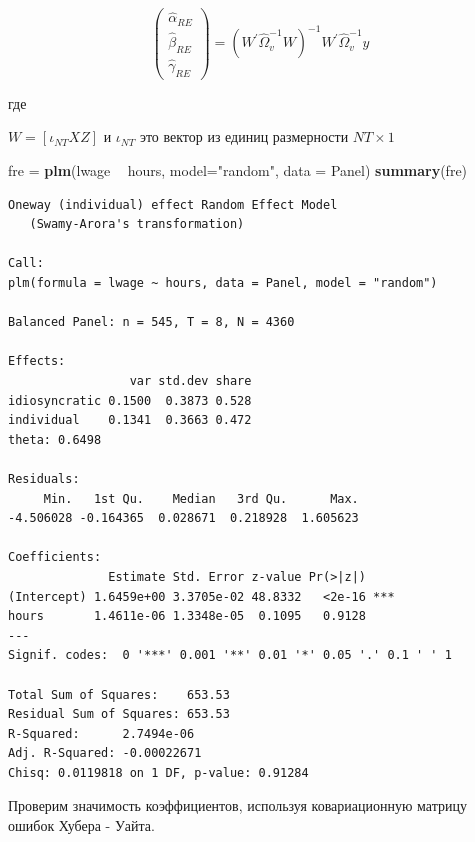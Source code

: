 \documentclass[]{book}
\newenvironment{Shaded}{\begin{snugshade}}{\end{snugshade}}
\newcommand{\DataTypeTok}[1]{\textcolor[rgb]{0.13,0.29,0.53}{#1}}
\newcommand{\KeywordTok}[1]{\textcolor[rgb]{0.13,0.29,0.53}{\textbf{#1}}}
\newcommand{\NormalTok}[1]{#1}
\newcommand{\OperatorTok}[1]{\textcolor[rgb]{0.81,0.36,0.00}{\textbf{#1}}}
\newcommand{\StringTok}[1]{\textcolor[rgb]{0.31,0.60,0.02}{#1}}
\begin{document}
\begin{equation}
\left(\begin{array}{c}{\widehat{\alpha}_{R E}} \\ {\widehat{\beta}_{R E}} \\ {\widehat{\gamma}_{R E}}\end{array}\right)=\left(W^{\prime} \widehat{\Omega}_{v}^{-1} W\right)^{-1} W^{\prime} \widehat{\Omega}_{v}^{-1} y
\end{equation}

где

\(W=\left[\iota_{N T} X Z\right] \text { и } \iota_{N T} \text { это вектор из единиц размерности } N T \times 1\)

\begin{Shaded}
\begin{Highlighting}[]
\NormalTok{fre =}\StringTok{ }\KeywordTok{plm}\NormalTok{(lwage }\OperatorTok{~}\StringTok{ }\NormalTok{hours, }\DataTypeTok{model=}\StringTok{"random"}\NormalTok{, }\DataTypeTok{data =}\NormalTok{ Panel)}
\KeywordTok{summary}\NormalTok{(fre)}
\end{Highlighting}
\end{Shaded}

\begin{verbatim}
Oneway (individual) effect Random Effect Model 
   (Swamy-Arora's transformation)

Call:
plm(formula = lwage ~ hours, data = Panel, model = "random")

Balanced Panel: n = 545, T = 8, N = 4360

Effects:
                 var std.dev share
idiosyncratic 0.1500  0.3873 0.528
individual    0.1341  0.3663 0.472
theta: 0.6498

Residuals:
     Min.   1st Qu.    Median   3rd Qu.      Max. 
-4.506028 -0.164365  0.028671  0.218928  1.605623 

Coefficients:
              Estimate Std. Error z-value Pr(>|z|)    
(Intercept) 1.6459e+00 3.3705e-02 48.8332   <2e-16 ***
hours       1.4611e-06 1.3348e-05  0.1095   0.9128    
---
Signif. codes:  0 '***' 0.001 '**' 0.01 '*' 0.05 '.' 0.1 ' ' 1

Total Sum of Squares:    653.53
Residual Sum of Squares: 653.53
R-Squared:      2.7494e-06
Adj. R-Squared: -0.00022671
Chisq: 0.0119818 on 1 DF, p-value: 0.91284
\end{verbatim}

Проверим значимость коэффициентов, используя ковариационную матрицу ошибок Хубера - Уайта.
\end{document}
